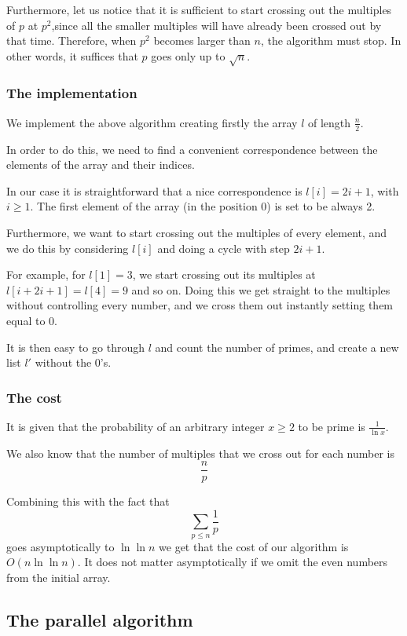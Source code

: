\documentclass[a4paper,11pt]{article}
\begin{document}
Furthermore, let us notice that it is sufficient to start crossing out the multiples of $p$ at $p^2$,since all the smaller multiples will have already been crossed out by that time. Therefore, when $p^2$ becomes larger than $n$, the algorithm must stop. In other words, it suffices that $p$ goes only up to $\sqrt{n}$.

\subsubsection{The implementation}


We implement the above algorithm creating firstly the array $l$ of length $\frac{n}{2}$. 

In order to do this, we need to find a convenient correspondence between the elements of the array and their indices. 

In our case it is straightforward that a nice correspondence is $l[i]=2i+1$, with $i \geq 1$. The first element of the array (in the position 0) is set to be always 2.

Furthermore, we want to start crossing out the multiples of every element, and we do this by considering $l[i]$ and doing a cycle with step $2i+1$. 

For example, for $l[1]=3$, we start crossing out its multiples at $l[i+2i+1]=l[4]=9$ and so on. Doing this we get straight to the multiples without controlling every number, and we cross them out instantly setting them equal to 0.

It is then easy to go through $l$ and count the number of primes, and create a new list $l'$ without the 0's.

\subsubsection{The cost}

It is given that the probability of an arbitrary integer $x \geq 2$ to be prime is $\frac{1}{\ln x}$. 

We also know that the number of multiples that we cross out for each number is $$\frac{n}{p}$$ 

Combining this with the fact that $$\displaystyle \sum_{p \leq n}\frac{1}{p}$$ goes asymptotically to $\ln \ln n$ we get that the cost of our algorithm is $O(n \ln \ln n)$. It does not matter asymptotically if we omit the even numbers from the initial array.

\subsection{The parallel algorithm}
\end{document}

